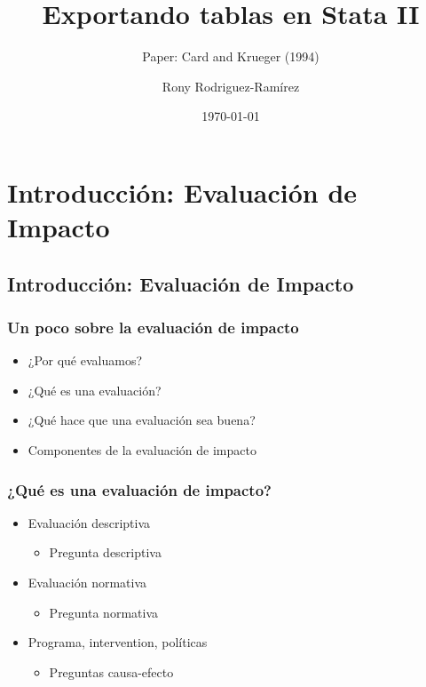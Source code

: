 \documentclass[10pt, aspectratio=169, compress]{beamer}
\title{Exportando tablas en Stata II}
\subtitle{Paper: Card and Krueger (1994)}
\author{Rony Rodriguez-Ramírez}
\institute{LAMBDA}
\date{\today}
\begin{document}
\begin{frame}[plain]
	\maketitle
\end{frame}
\section{Introducción: Evaluación de Impacto}
\subsection{Introducción: Evaluación de Impacto}
\begin{frame}
	\frametitle{Un poco sobre la evaluación de impacto}
	\begin{itemize}
		\item ¿Por qué evaluamos? 
		\item ¿Qué es una evaluación? 
		\item ¿Qué hace que una evaluación sea buena? 
		\item Componentes de la evaluación de impacto
	\end{itemize}
\end{frame}
\begin{frame}
	\frametitle{¿Qué es una evaluación de impacto?}
	\begin{itemize}
		\item Evaluación descriptiva
		\begin{itemize}
			\item Pregunta descriptiva
		\end{itemize}
		\item Evaluación normativa
		\begin{itemize}
			\item Pregunta normativa
		\end{itemize}
		\item Programa, intervention, políticas
		\begin{itemize}
			\item Preguntas causa-efecto
		\end{itemize}
	\end{itemize}
\end{frame}
\end{document}
